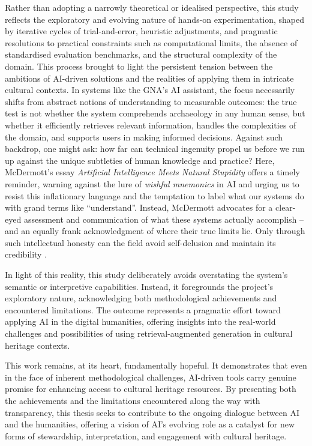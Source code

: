 \begin{spacing}{1.5}
Rather than adopting a narrowly theoretical or idealised perspective, this study reflects the exploratory and evolving nature of hands-on experimentation, shaped by iterative cycles of trial-and-error, heuristic adjustments, and pragmatic resolutions to practical constraints such as computational limits, the absence of standardised evaluation benchmarks, and the structural complexity of the domain. This process brought to light the persistent tension between the ambitions of AI-driven solutions and the realities of applying them in intricate cultural contexts. In systems like the GNA’s AI assistant, the focus necessarily shifts from abstract notions of understanding to measurable outcomes: the true test is not whether the system comprehends archaeology in any human sense, but whether it efficiently retrieves relevant information, handles the complexities of the domain, and supports users in making informed decisions. Against such backdrop, one might ask: how far can technical ingenuity propel us before we run up against the unique subtleties of human knowledge and practice? Here, McDermott’s essay \textit{Artificial Intelligence Meets Natural Stupidity} offers a timely reminder, warning against the lure of \textit{wishful mnemonics} in AI and urging us to resist this inflationary language and the temptation to label what our systems do with grand terms like ``understand''. Instead, McDermott advocates for a clear-eyed assessment and communication of what these systems actually accomplish -- and an equally frank acknowledgment of where their true limits lie. Only through such intellectual honesty can the field avoid self-delusion and maintain its credibility \citep{mcdermott_artificial_1976}.

In light of this reality, this study deliberately avoids overstating the system’s semantic or interpretive capabilities. Instead, it foregrounds the project’s exploratory nature, acknowledging both methodological achievements and encountered limitations. The outcome represents a pragmatic effort toward applying AI in the digital humanities, offering insights into the real-world challenges and possibilities of using retrieval-augmented generation in cultural heritage contexts.

This work remains, at its heart, fundamentally hopeful. It demonstrates that even in the face of inherent methodological challenges, AI-driven tools carry genuine promise for enhancing access to cultural heritage resources. By presenting both the achievements and the limitations encountered along the way with transparency, this thesis seeks to contribute to the ongoing dialogue between AI and the humanities, offering a vision of AI’s evolving role as a catalyst for new forms of stewardship, interpretation, and engagement with cultural heritage.

\end{spacing}